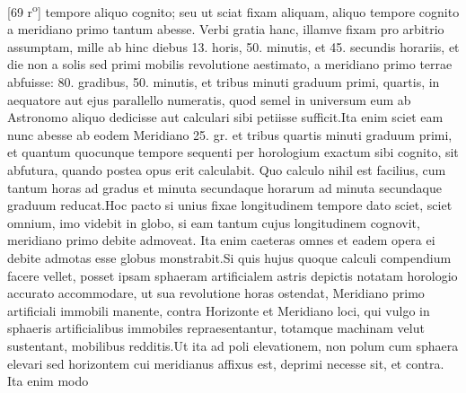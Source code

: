 [69 r\textsuperscript{o}]  tempore aliquo cognito; seu ut sciat fixam\protect{} aliquam, aliquo tempore cognito a meridiano \protect{} primo tantum abesse. Verbi gratia hanc, illamve fixam\protect{} pro arbitrio assumptam, mille ab hinc diebus 13. horis, 50. minutis, et 45. secundis horariis, et die non a solis sed primi mobilis revolutione aestimato, a meridiano\protect{} primo terrae abfuisse: 80. gradibus, 50. minutis, et tribus minuti graduum primi, quartis, in aequatore \protect{} aut ejus parallello\protect{} numeratis, quod semel in universum eum ab Astronomo aliquo dedicisse aut calculari sibi petiisse sufficit.\pend \pstart Ita enim sciet eam nunc abesse ab eodem Meridiano \protect{} 25. gr. et tribus quartis minuti graduum primi, et quantum quocunque tempore sequenti per horologium\protect{} exactum sibi cognito, sit abfutura, quando postea opus erit calculabit. Quo calculo nihil est facilius, cum tantum horas ad gradus et minuta secundaque horarum ad minuta secundaque graduum reducat.\pend \pstart Hoc pacto si unius fixae\protect{} longitudinem\protect{} tempore dato sciet, sciet omnium, imo videbit in globo, si eam tantum cujus longitudinem\protect{} cognovit, meridiano\protect{} primo debite admoveat. Ita enim caeteras omnes et eadem opera ei debite admotas esse globus monstrabit.\pend \pstart Si quis hujus quoque calculi compendium facere vellet, posset ipsam sphaeram artificialem astris depictis notatam horologio\protect{} accurato accommodare, ut sua revolutione horas ostendat, Meridiano\protect{} primo artificiali immobili manente, contra Horizonte et Meridiano\protect{} loci, qui vulgo in  sphaeris artificialibus immobiles repraesentantur, totamque machinam velut sustentant,  mobilibus redditis.\pend \pstart Ut ita  ad poli elevationem\protect{}, non polum\protect{} cum sphaera elevari sed horizontem cui meridianus\protect{} affixus est, deprimi necesse sit, et contra. Ita enim modo 